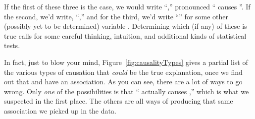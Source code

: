 
If the first of these three is the case, we would write ``,''
pronounced `` causes ''. If the second, we'd write, ``,'' and for the third, we'd write ``'' for some other
(possibly yet to be determined) variable . Determining which (if any) of
these is true calls for some careful thinking, intuition, and additional kinds
of statistical tests.

In fact, just to blow your mind, Figure~\ref{fig:causalityTypes} gives a
partial list of the various types of causation that \textit{could} be the true
explanation, once we find out that  and  have an association. As you can
see, there are a lot of ways to go wrong. Only \textit{one} of the
possibilities is that `` actually causes ,'' which is what we suspected
in the first place. The others are all ways of producing that same association
we picked up in the data.

